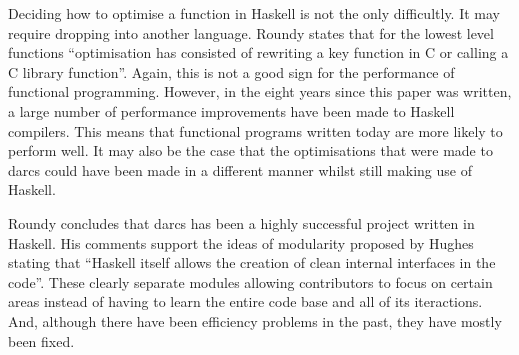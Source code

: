 Deciding how to optimise a function in Haskell is not the only difficultly. It
may require dropping into another language. Roundy states that for the lowest
level functions ``optimisation has consisted of rewriting a key function in C
or calling a C library function''. Again, this is not a good sign for the performance
of functional programming. However, in the eight years since this paper was
written, a large number of performance improvements have been made to Haskell
compilers. This means that functional programs written today are more likely
to perform well. It may also be the case that the optimisations that were made
to darcs could have been made in a different manner whilst still making use of
Haskell.

Roundy concludes that darcs has been a highly successful project written in
Haskell. His comments support the ideas of modularity proposed by Hughes stating
that ``Haskell itself allows the creation of clean internal interfaces in the
code''. These clearly separate modules allowing contributors to focus on certain
areas instead of having to learn the entire code base and all of its iteractions.
And, although there have been efficiency problems in the past, they have mostly
been fixed.
